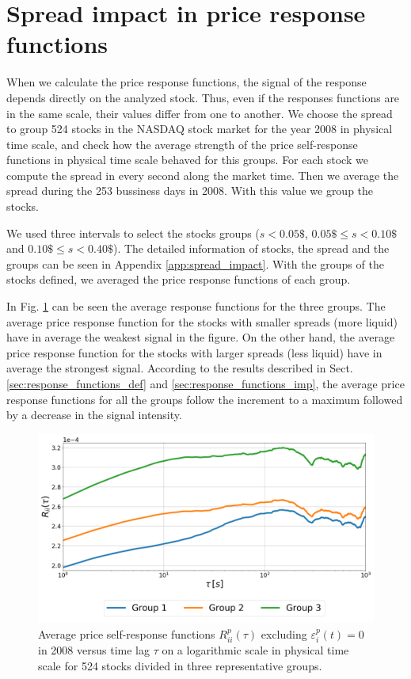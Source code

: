 \section{Spread impact in price response functions}\label{sec:spread_impact}

When we calculate the price response functions, the signal of the response
depends directly on the analyzed stock. Thus, even if the responses functions
are in the same scale, their values differ from one to another. We choose the
spread to group 524 stocks in the NASDAQ stock market for the year 2008 in
physical time scale, and check how the average strength of the price
self-response functions in physical time scale behaved for this groups.
For each stock we compute the spread in every second along the market time.
Then we average the spread during the 253 bussiness days in 2008. With this
value we group the stocks.

We used three intervals to select the stocks groups ($s<0.05\$$,
$0.05\$ \le s <0.10\$$ and $0.10\$ \le s <0.40\$$). The detailed information of
stocks, the spread and the groups can be seen in Appendix
\ref{app:spread_impact}. With the groups of the stocks defined, we averaged the
price response functions of each group.

In Fig. \ref{fig:spread_impact} can be seen the average response functions for
the three groups. The average price response function for the stocks with
smaller spreads (more liquid) have in average the weakest signal in the figure.
On the other hand, the average price response function for the stocks with
larger spreads (less liquid) have in average the strongest signal. According to
the results described in Sect. \ref{sec:response_functions_def} and
\ref{sec:response_functions_imp}, the average price response functions for all
the groups follow the increment to a maximum followed by a decrease in the
signal intensity.

\begin{figure}[htbp]
    \centering
    \includegraphics[width=\columnwidth]{figures/06_spread_impact_2008.png}
    \caption{Average price self-response functions
             $R^{p}_{ii}\left(\tau\right)$ excluding
             $\varepsilon^{p}_{i}\left(t\right) = 0$ in 2008 versus time lag
             $\tau$ on a logarithmic scale in physical time scale for 524
             stocks divided in three representative groups.}
    \label{fig:spread_impact}
\end{figure}

